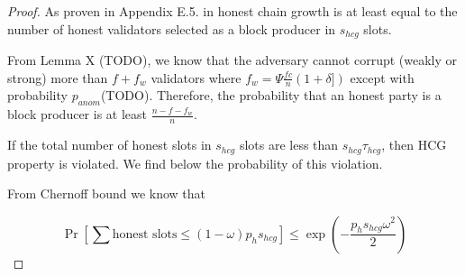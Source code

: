 \begin{proof}
	As proven in  Appendix E.5. in \cite{genesis} honest chain growth is at least equal to the number of honest validators selected as a block producer in $ s_{hcg} $ slots.
	
	From Lemma X (TODO), we know that the adversary cannot corrupt (weakly or strong) more than $f + f_w $ validators where $ f_w  =  \Psi\frac{fc}{n}(1+\delta])$ except with probability $ p_{anom} $(TODO).
	Therefore, the probability that an honest party is a block producer is at least $ \frac{n - f - f_w}{n} $.
	
	If the total number of honest slots in $ s_{hcg} $ slots are less than  $s_{hcg}\tau_{hcg}$, then HCG property is violated. 
	We find below the probability of this violation. 
	
	From Chernoff bound we know that
	
	$$\Pr[\sum \text{honest slots} \leq  (1-\omega) p_h s_{hcg}] \leq \exp(-\frac{p_h s_{hcg} \omega^2}{2})$$
	
\end{proof}


\begin{theorem}
\end{theorem}




